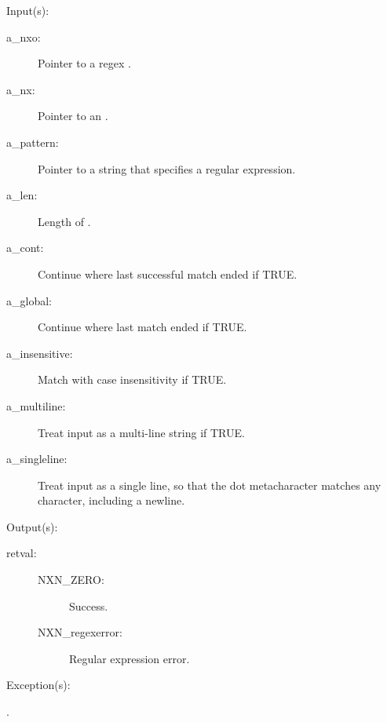 \begin{capi}
\label{nxo_regex_new}
	\begin{capilist}
	\item[Input(s): ]
		\begin{description}\item[]
		\item[a\_nxo: ]
			Pointer to a regex .
		\item[a\_nx: ]
			Pointer to an .
		\item[a\_pattern: ]
			Pointer to a string that specifies a regular expression.
		\item[a\_len: ]
			Length of .
		\item[a\_cont: ]
			Continue where last successful match ended if TRUE.
		\item[a\_global: ]
			Continue where last match ended if TRUE.
		\item[a\_insensitive: ]
			Match with case insensitivity if TRUE.
		\item[a\_multiline: ]
			Treat input as a multi-line string if TRUE.
		\item[a\_singleline: ]
			Treat input as a single line, so that the dot
			metacharacter matches any character, including a
			newline.
		\end{description}
	\item[Output(s): ]
		\begin{description}\item[]
		\item[retval: ]
			\begin{description}\item[]
			\item[NXN\_ZERO: ] Success.
			\item[NXN\_regexerror: ] Regular expression error.
			\end{description}
		\end{description}
	\item[Exception(s): ]
		\begin{description}\item[]
		\item[.]
		\end{description}

\end{capilist}
\end{capi}
